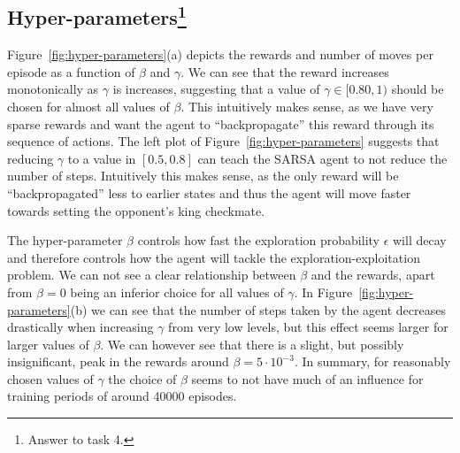 \documentclass[conference]{IEEEtran}
\begin{document}
\subsection{Hyper-parameters\footnote{Answer to task 4.}}\label{sec:hyper-parameters}


Figure~\ref{fig:hyper-parameters}(a) depicts the rewards and number of moves per episode as a function of $\beta$ and $\gamma$. We can see that the reward increases monotonically as $\gamma$ is increases, suggesting that a value of $\gamma\in[0.80, 1)$ should be chosen for almost all values of $\beta$. This intuitively makes sense, as we have very sparse rewards and want the agent to ``backpropagate'' this reward through its sequence of actions. The left plot of Figure~\ref{fig:hyper-parameters} suggests that reducing $\gamma$ to a value in $[0.5, 0.8]$ can teach the SARSA agent to not reduce the number of steps. Intuitively this makes sense, as the only reward will be ``backpropagated'' less to earlier states and thus the agent will move faster towards setting the opponent's king checkmate.

The hyper-parameter $\beta$ controls how fast the exploration probability $\epsilon$ will decay and therefore controls how the agent will tackle the exploration-exploitation problem. We can not see a clear relationship between $\beta$ and the rewards, apart from $\beta=0$ being an inferior choice for all values of $\gamma$. In Figure~\ref{fig:hyper-parameters}(b) we can see that the number of steps taken by the agent decreases drastically when increasing $\gamma$ from very low levels, but this effect seems larger for larger values of $\beta$. We can however see that there is a slight, but possibly insignificant, peak in the rewards around $\beta = 5\cdot 10^{-3}$. In summary, for reasonably chosen values of $\gamma$ the choice of $\beta$ seems to not have much of an influence for training periods of around 40000 episodes.
\end{document}
